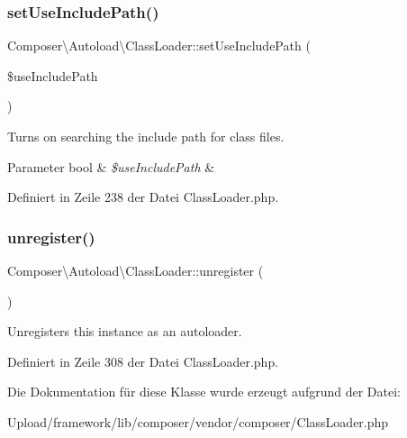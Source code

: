\subsubsection{\texorpdfstring{set\+Use\+Include\+Path()}{setUseIncludePath()}}
{\footnotesize\ttfamily Composer\textbackslash{}\+Autoload\textbackslash{}\+Class\+Loader\+::set\+Use\+Include\+Path (\begin{DoxyParamCaption}\item[{}]{\$use\+Include\+Path }\end{DoxyParamCaption})}

Turns on searching the include path for class files.


\begin{DoxyParams}[1]{Parameter}
bool & {\em \$use\+Include\+Path} & \\
\hline
\end{DoxyParams}


Definiert in Zeile 238 der Datei Class\+Loader.\+php.

\mbox{\label{class_composer_1_1_autoload_1_1_class_loader_a2472d57551ee473381beea31ff642136}} 
\subsubsection{\texorpdfstring{unregister()}{unregister()}}
{\footnotesize\ttfamily Composer\textbackslash{}\+Autoload\textbackslash{}\+Class\+Loader\+::unregister (\begin{DoxyParamCaption}{ }\end{DoxyParamCaption})}

Unregisters this instance as an autoloader. 

Definiert in Zeile 308 der Datei Class\+Loader.\+php.



Die Dokumentation für diese Klasse wurde erzeugt aufgrund der Datei\+:\begin{DoxyCompactItemize}
\item 
Upload/framework/lib/composer/vendor/composer/Class\+Loader.\+php\end{DoxyCompactItemize}
